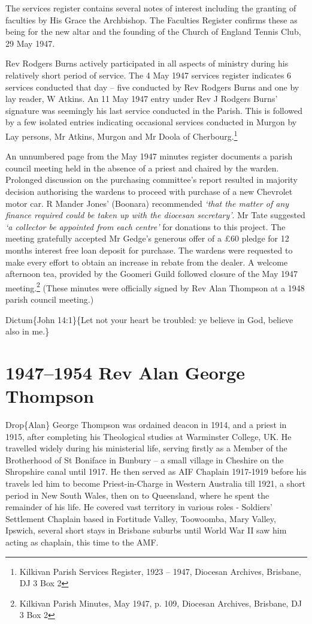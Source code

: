 The services register contains several notes of interest including the granting of faculties by His Grace the Archbishop. The Faculties Register confirms these as being for the new altar and the founding of the Church of England Tennis Club, 29 May 1947.

Rev Rodgers Burns actively participated in all aspects of ministry during his relatively short period of service. The 4 May 1947 services register indicates 6 services conducted that day -- five conducted by Rev Rodgers Burns and one by lay reader, W Atkins. An 11 May 1947 entry under Rev J Rodgers Burns' signature was seemingly his last service conducted in the Parish. This is followed by a few isolated entries indicating occasional services conducted in Murgon by Lay persons, Mr Atkins, Murgon and Mr Doola of Cherbourg.\footnote{Kilkivan Parish Services Register, 1923 -- 1947, Diocesan Archives, Brisbane, DJ 3 Box 2}

An unnumbered page from the May 1947 minutes register documents a parish council meeting held in the absence of a priest and chaired by the warden. Prolonged discussion on the purchasing committee's report resulted in majority decision authorising the wardens to proceed with purchase of a new Chevrolet motor car. R Mander Jones' (Boonara) recommended \emph{`that the matter of any finance required could be taken up with the diocesan secretary'}. Mr Tate suggested \emph{`a collector be appointed from each centre'} for donations to this project. The meeting gratefully accepted Mr Gedge's generous offer of a £60 pledge for 12 months interest free loan deposit for purchase. The wardens were requested to make every effort to obtain an increase in rebate from the dealer. A welcome afternoon tea, provided by the Goomeri Guild followed closure of the May 1947 meeting.\footnote{Kilkivan Parish Minutes, May 1947, p. 109, Diocesan Archives, Brisbane, DJ 3 Box 2} (These minutes were officially signed by Rev Alan Thompson at a 1948 parish council meeting.)

Dictum\{John 14:1\}\{Let not your heart be troubled: ye believe in God, believe also in me.\}

\hypertarget{rev-alan-george-thompson}{%
\chapter{1947--1954 Rev Alan George Thompson}\label{rev-alan-george-thompson}}

Drop\{Alan\} George Thompson was ordained deacon in 1914, and a priest in 1915, after completing his Theological studies at Warminster College, UK. He travelled widely during his ministerial life, serving firstly as a Member of the Brotherhood of St Boniface in Bunbury -- a small village in Cheshire on the Shropshire canal until 1917. He then served as AIF Chaplain 1917-1919 before his travels led him to become Priest-in-Charge in Western Australia till 1921, a short period in New South Wales, then on to Queensland, where he spent the remainder of his life. He covered vast territory in various roles - Soldiers' Settlement Chaplain based in Fortitude Valley, Toowoomba, Mary Valley, Ipswich, several short stays in Brisbane suburbs until World War II saw him acting as chaplain, this time to the AMF.


